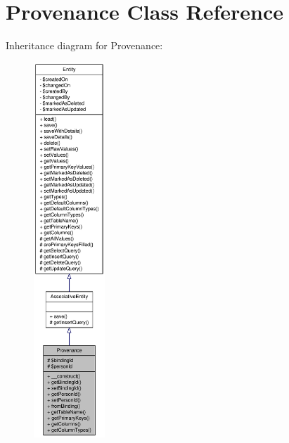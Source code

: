 \hypertarget{classProvenance}{
\section{Provenance Class Reference}
\label{classProvenance}
}


Inheritance diagram for Provenance:\nopagebreak
\begin{figure}[H]
\begin{center}
\leavevmode
\includegraphics[height=400pt]{classProvenance__inherit__graph}
\end{center}
\end{figure}


